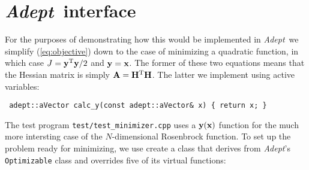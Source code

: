 \documentclass[a4,oneside]{book}
\def\codesize{\small}
\def\Adept{\emph{Adept}}
\def\code#1{{\codesize\texttt{#1}}}
\begin{document}
\section{\Adept\ interface}
\label{sec:minimizer_interface}
For the purposes of demonstrating how this would be implemented in
\Adept\ we simplify (\ref{eq:objective}) down to the case of
minimizing a quadratic function, in which case $J={\bf
  y}^\mathrm{T}{\bf y}/2$ and ${\bf y}={\bf x}$.  The former of these
two equations means that the Hessian matrix is simply ${\bf A}={\bf
  H}^\mathrm{T}{\bf H}$. The latter we implement using active
variables:
%
\begin{lstlisting}
 adept::aVector calc_y(const adept::aVector& x) { return x; }
\end{lstlisting}
%
The test program \code{test/test\_minimizer.cpp} uses a ${\bf y}({\bf
  x})$ function for the much more intersting case of the
$N$-dimensional Rosenbrock function.  To set up the problem ready for
minimizing, we use create a class that derives from \Adept's
\code{Optimizable} class and overrides five of its virtual functions:
%
\end{document}
